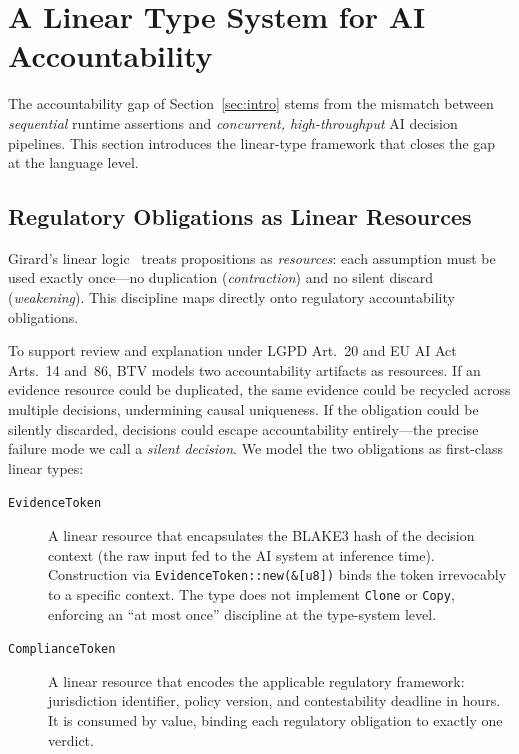 
\section{A Linear Type System for AI Accountability}
\label{sec:type_system}

The accountability gap of Section~\ref{sec:intro} stems from the mismatch
between \emph{sequential} runtime assertions and \emph{concurrent,
high-throughput} AI decision pipelines.  This section introduces the
linear-type framework that closes the gap at the language level.

\subsection{Regulatory Obligations as Linear Resources}
\label{sec:linear_resources}

Girard's linear logic~\cite{girard1987linear} treats propositions as
\emph{resources}: each assumption must be used exactly once---no
duplication (\emph{contraction}) and no silent discard
(\emph{weakening}).  This discipline maps directly onto regulatory
accountability obligations.

To support review and explanation under LGPD Art.~20 and EU AI Act
Arts.~14 and~86, BTV models two accountability artifacts as resources.
If an evidence resource could be duplicated,
the same evidence could be recycled across multiple decisions,
undermining causal uniqueness.  If the obligation could be silently
discarded, decisions could escape accountability entirely---the
precise failure mode we call a \emph{silent decision}.  We model the
two obligations as first-class linear types:

\begin{description}
  \item[\texttt{EvidenceToken}]  A linear resource that encapsulates
    the BLAKE3 hash of the decision context (the raw input fed to the
    AI system at inference time).  Construction via
    \texttt{EvidenceToken::new(\&[u8])} binds the token irrevocably
    to a specific context.  The type does not implement \texttt{Clone}
    or \texttt{Copy}, enforcing an ``at most once'' discipline at
    the type-system level.

  \item[\texttt{ComplianceToken}]  A linear resource that encodes the
    applicable regulatory framework: jurisdiction identifier, policy
    version, and contestability deadline in hours.  It is consumed
    by value, binding each regulatory obligation to exactly one
    verdict.
\end{description}

